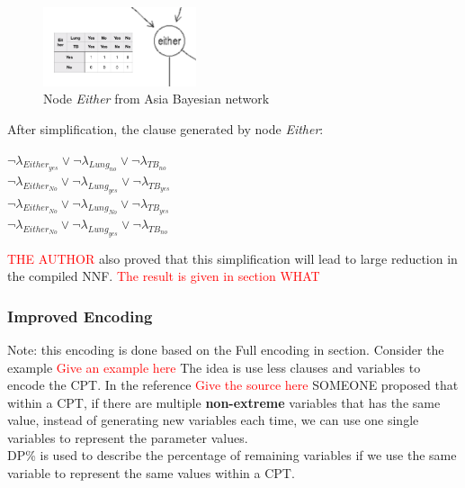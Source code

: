        \begin{figure}[h]
            \centering
            \includegraphics[width=0.4\textwidth]{pic/either01s.png}
            \caption{Node \textit{Either} from Asia Bayesian network}
            \label{fig:either01}
        \end{figure}
        
        After simplification, the clause generated by node \textit{Either}:\\
        \begin{center}
            $\neg \lambda_{Either_{yes}} \vee \neg \lambda_{Lung_{no}} \vee \neg  \lambda_{TB_{no}} $\\
            $\neg \lambda_{Either_{No}} \vee \neg \lambda_{Lung_{yes}} \vee \neg \lambda_{TB_{yes}}$\\
            $\neg \lambda_{Either_{No}} \vee \neg \lambda_{Lung_{No}} \vee \neg  \lambda_{TB_{yes}}$\\
            $\neg  \lambda_{Either_{No}} \vee \neg  \lambda_{Lung_{yes}} \vee \neg  \lambda_{TB_{no}}$
        \end{center}
        
        \textcolor{red}{THE AUTHOR} also proved that this simplification will lead to large reduction in the compiled NNF.\cite{enc1} \textcolor{red}{The result is given in section WHAT}
        
        
        \subsubsection{Improved Encoding}
        Note: this encoding is done based on the Full encoding in section. Consider the example \textcolor{red}{Give an example here}
        The idea is use less clauses and variables to encode the CPT. 
        In the reference \textcolor{red}{Give the source here} SOMEONE proposed that within a CPT, if there are multiple \textbf{non-extreme} variables that has the same value, instead of generating new variables each time, we can use one single variables to represent the parameter values.\\
        DP\% is used to describe the
        percentage of remaining variables if we use the same variable to represent the same values within a CPT.\\
        
